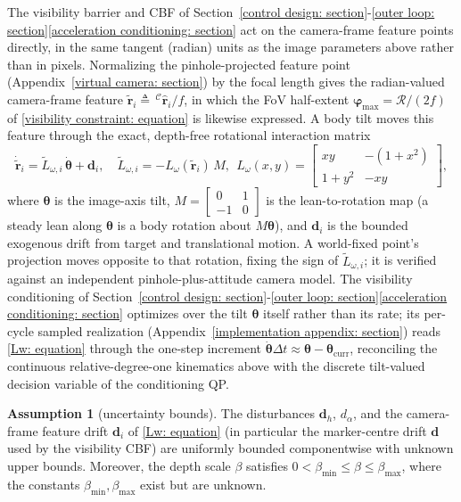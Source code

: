 \documentclass{IEEEtaes}
\theoremstyle{definition}
\newtheorem{assumption}{Assumption}
\theoremstyle{remark}
\begin{document}
The visibility barrier and CBF of Section~\ref{control design: section}-\ref{outer loop: section}\ref{acceleration conditioning: section} act on the camera-frame feature points directly, in the same tangent (radian) units as the image parameters above rather than in pixels. Normalizing the pinhole-projected feature point (Appendix~\ref{virtual camera: section}) by the focal length gives the radian-valued camera-frame feature $\tilde{\boldsymbol{r}}_i \triangleq \,^\mathcal{C}\hat{\boldsymbol{r}}_i/f$, in which the FoV half-extent $\boldsymbol{\varphi}_\text{max}=\mathcal{R}/(2f)$ of \eqref{visibility constraint: equation} is likewise expressed. A body tilt moves this feature through the exact, depth-free rotational interaction matrix
\begin{equation} \label{Lw: equation}
    \dot{\tilde{\boldsymbol{r}}}_i = \tilde{L}_{\omega,i}\,\dot{\boldsymbol{\theta}} + \boldsymbol{d}_i,\quad \tilde{L}_{\omega,i}=-L_\omega(\tilde{\boldsymbol{r}}_i)\,M,\ \ L_\omega(x,y)=\begin{bmatrix} xy & -(1+x^2)\\ 1+y^2 & -xy\end{bmatrix},
\end{equation}
where $\boldsymbol{\theta}$ is the image-axis tilt, $M=[\begin{smallmatrix}0&1\\-1&0\end{smallmatrix}]$ is the lean-to-rotation map (a steady lean along $\boldsymbol{\theta}$ is a body rotation about $M\boldsymbol{\theta}$), and $\boldsymbol{d}_i$ is the bounded exogenous drift from target and translational motion. A world-fixed point's projection moves opposite to that rotation, fixing the sign of $\tilde{L}_{\omega,i}$; it is verified against an independent pinhole-plus-attitude camera model. The visibility conditioning of Section~\ref{control design: section}-\ref{outer loop: section}\ref{acceleration conditioning: section} optimizes over the tilt $\boldsymbol{\theta}$ itself rather than its rate; its per-cycle sampled realization (Appendix~\ref{implementation appendix: section}) reads \eqref{Lw: equation} through the one-step increment $\dot{\boldsymbol{\theta}}\Delta t\approx\boldsymbol{\theta}-\boldsymbol{\theta}_\text{curr}$, reconciling the continuous relative-degree-one kinematics above with the discrete tilt-valued decision variable of the conditioning QP.

\begin{assumption}[uncertainty bounds]\label{asm:uncertainty} The disturbances $\boldsymbol{d}_h$, $d_{\alpha}$, and the camera-frame feature drift $\boldsymbol{d}_i$ of \eqref{Lw: equation} (in particular the marker-centre drift $\boldsymbol{d}$ used by the visibility CBF) are uniformly bounded componentwise with unknown upper bounds. Moreover, the depth scale $\beta$ satisfies $0<\beta_{\min}\le\beta\le\beta_{\max}$, where the constants $\beta_{\min},\beta_{\max}$ exist but are unknown.\end{assumption}
\end{document}
